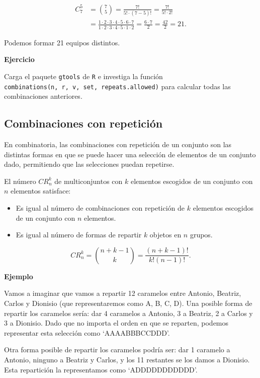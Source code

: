 \documentclass[
  letterpaper,
  DIV=11,
  numbers=noendperiod]{scrreprt}
\providecommand{\tightlist}{%
  \setlength{\itemsep}{0pt}\setlength{\parskip}{0pt}}\usepackage{longtable,booktabs,array}
\begin{document}
\[
\begin{array}{rl}
C_7^5&={7\choose 5} = \frac{7!}{5!\cdot (7-5)!}=\frac{7!}{5!\cdot 2!} \\
&=\frac{1\cdot 2\cdot 3 \cdot 4\cdot 5\cdot 6\cdot 7}{1\cdot 2\cdot 3 \cdot 4\cdot 5\cdot 1\cdot 2}=\frac{6\cdot 7}{2}=\frac{42}{2}=21.
\end{array}
\]

Podemos formar 21 equipos distintos.

\textbf{Ejercicio}

Carga el paquete \texttt{gtools} de \texttt{R} e investiga la función
\texttt{combinations(n,\ r,\ v,\ set,\ repeats.allowed)} para calcular
todas las combinaciones anteriores.

\hypertarget{combinaciones-con-repeticiuxf3n}{%
\subsection{Combinaciones con
repetición}\label{combinaciones-con-repeticiuxf3n}}

En combinatoria, las combinaciones con repetición de un conjunto son las
distintas formas en que se puede hacer una selección de elementos de un
conjunto dado, permitiendo que las selecciones puedan repetirse.

El número \(CR_n^k\) de multiconjuntos con \(k\) elementos escogidos de
un conjunto con \(n\) elementos satisface:

\begin{itemize}
\tightlist
\item
  Es igual al número de combinaciones con repetición de \(k\) elementos
  escogidos de un conjunto con \(n\) elementos.
\item
  Es igual al número de formas de repartir \(k\) objetos en \(n\)
  grupos.
\end{itemize}

\[CR_n^k = \binom{n+k-1}{k} = \frac{(n+k-1)!}{k!(n-1)!}.\]

\textbf{Ejemplo}

Vamos a imaginar que vamos a repartir 12 caramelos entre Antonio,
Beatriz, Carlos y Dionisio (que representaremos como A, B, C, D). Una
posible forma de repartir los caramelos sería: dar 4 caramelos a
Antonio, 3 a Beatriz, 2 a Carlos y 3 a Dionisio. Dado que no importa el
orden en que se reparten, podemos representar esta selección como
`AAAABBBCCDDD'.

Otra forma posible de repartir los caramelos podría ser: dar 1 caramelo
a Antonio, ninguno a Beatriz y Carlos, y los 11 restantes se los damos a
Dionisio. Esta repartición la representamos como `ADDDDDDDDDDD'.
\end{document}
